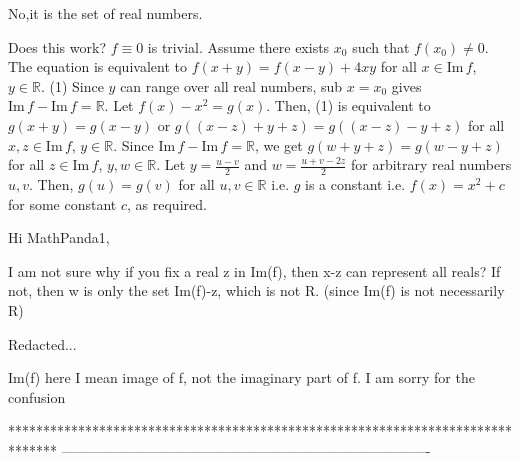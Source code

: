 \begin{mysolution}
	No,it is the set of real numbers.
\end{mysolution}



\begin{mysolution}
	Does this work?
$f \equiv 0$ is trivial. Assume there exists $x_0$ such that $f(x_0) \neq 0$.
The equation is equivalent to $f(x+y)=f(x-y)+4xy$ for all $x \in \mbox{Im}\,f$, $y \in \mathbb{R}$.              (1)
Since $y$ can range over all real numbers, sub $x=x_0$ gives $\mbox{Im}\,f - \mbox{Im}\,f = \mathbb{R}$.
Let $f(x)-x^2=g(x)$. Then, (1) is equivalent to $g(x+y)=g(x-y)$ or $g((x-z)+y+z)=g((x-z)-y+z)$ for all $x,z \in \mbox{Im}\,f$, $y \in \mathbb{R}$.
Since $\mbox{Im}\,f - \mbox{Im}\,f = \mathbb{R}$, we get $g(w+y+z)=g(w-y+z)$ for all $z \in \mbox{Im}\,f$, $y,w \in \mathbb{R}$. Let $y= \frac{u-v}{2}$ and $w=\frac{u+v-2z}{2}$ for arbitrary real numbers $u, v$. Then, $g(u)=g(v)$ for all $u,v \in \mathbb{R}$ i.e. $g$ is a constant i.e. $f(x)=x^2+c$ for some constant $c$, as required.

\end{mysolution}



\begin{mysolution}
	Hi MathPanda1,

I am not sure why if you fix a real z in Im(f), then x-z can represent all reals? If not, then w is only the set Im(f)-z, which is not R. (since Im(f) is not necessarily R)
\end{mysolution}



\begin{mysolution}
	Redacted...
\end{mysolution}



\begin{mysolution}
	Im(f) here I mean image of f, not the imaginary part of f. I am sorry for the confusion
\end{mysolution}
*******************************************************************************
-------------------------------------------------------------------------------

